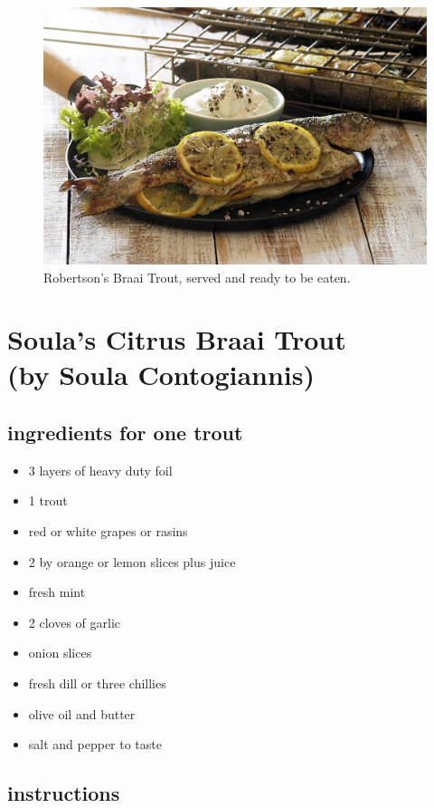 \begin{figure}[H]
\centering
  \includegraphics[scale=0.2]{recipes/braaiTroutServed.jpg}
   \caption{Robertson's Braai Trout, served and ready to be eaten.}
  \label{fig:braaiTroutServed}
\end{figure}

\section{Soula's Citrus Braai Trout \\ (by Soula Contogiannis)}

\subsection*{ingredients for one trout}

\begin{itemize}
\item 3 layers of heavy duty foil
\item 1 trout
\item red or white grapes or rasins
\item 2 by orange or lemon slices plus juice 
\item fresh mint
\item 2 cloves of garlic
\item onion slices
\item fresh dill or three chillies
\item olive oil and butter
\item salt and pepper to taste
\end{itemize}

\subsection*{instructions}

